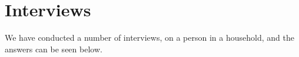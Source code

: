 \section{Interviews}
We have conducted a number of interviews, on a person in a household, and the answers can be seen below. 